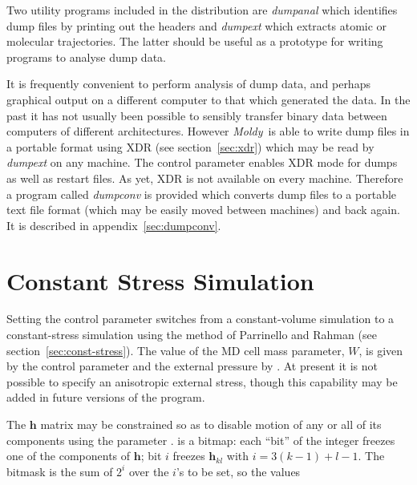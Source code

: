 \documentclass[a4paper,twoside]{report}
\newcommand{\bm}[1]{\mathbf{#1}}
\newcommand{\moldy}{\emph{Moldy}}
\begin{document}
Two utility programs included in the distribution are \emph{dumpanal}
which identifies dump files by printing out the headers and
\emph{dumpext} which extracts atomic or molecular trajectories.  The
latter should be useful as a prototype for writing programs to analyse
dump data.

It is frequently convenient to perform analysis of dump data, and
perhaps graphical output on a different computer to that which
generated the data.  In the past it has not usually been possible to
sensibly transfer binary data between computers of different
architectures.  However \moldy\ is able to write dump files in a
portable format using XDR (see section~\ref{sec:xdr}) which may be
read by \emph{dumpext} on any machine.  The control parameter
 enables XDR mode for dumps as well as restart files.
As yet, XDR is not available on every machine.  Therefore a program
called \emph{dumpconv} is provided which converts dump files to a
portable text file format (which may be easily moved between machines)
and back again. It is described in appendix~\ref{sec:dumpconv}.


\section{Constant Stress Simulation}%

Setting  the control parameter    switches from a
constant-volume  simulation to a con\-stant-stress  simulation using the
method     of    Parrinello     and    Rahman\cite{parrinello:81}   (see
section~\ref{sec:const-stress}).   The value of  the MD cell mass
parameter,  $W$,  is given by the control  parameter   and  the
external pressure by . At present it is not possible to
specify an anisotropic external stress, though this  capability may be
added in future versions of the program.

\label{sec:cp-constraints}
The $\bm{h}$ matrix may be constrained so as to disable motion of any
or all of its components using the parameter . 
 is a bitmap: each ``bit'' of the integer
freezes one of the components of $\bm{h}$;
bit $i$ freezes $ \bm{h}_{kl}$ with 
$ i = 3 (k\!-\!1)\! +\! l\! -\!1$.
The bitmask is the sum of $2^i$ over the $i$'s to be set, so the
 values
\end{document}
